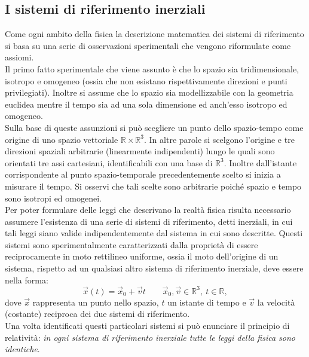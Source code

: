 \subsection{I sistemi di riferimento inerziali}
Come ogni ambito della fisica la descrizione matematica dei sistemi di riferimento si basa su una serie di osservazioni sperimentali che vengono riformulate come assiomi.\\

Il primo fatto sperimentale che viene assunto è che lo spazio sia tridimensionale, isotropo e omogeneo (ossia che non esistano rispettivamente direzioni e punti privilegiati). Inoltre si assume che lo spazio sia modellizzabile con la 
geometria euclidea mentre il tempo sia ad una sola dimensione ed anch'esso isotropo ed omogeneo.\\
Sulla base di queste assunzioni si può scegliere un punto dello spazio-tempo come 
origine di uno spazio vettoriale $\mathbb{R}\times\mathbb{R}^3$. In altre parole si scelgono l'origine e tre direzioni spaziali arbitrarie (linearmente indipendenti) lungo le quali sono orientati tre assi cartesiani, identificabili con una base di $\mathbb{R}^3$.
Inoltre dall'istante corrispondente al punto spazio-temporale precedentemente scelto si inizia a misurare il tempo. Si osservi che tali scelte sono arbitrarie poiché spazio e tempo sono isotropi ed omogenei.\\

Per poter formulare delle leggi che descrivano la realtà fisica risulta necessario assumere l'esistenza di una serie di sistemi di riferimento, detti inerziali, in cui tali leggi siano valide indipendentemente dal sistema in cui sono descritte. Questi sistemi sono sperimentalmente caratterizzati dalla proprietà di essere reciprocamente in moto rettilineo uniforme, ossia il moto dell'origine di un sistema, rispetto ad un qualsiasi altro sistema di riferimento inerziale, deve essere nella forma: 
\begin{equation}
	\vec x(t)=\vec x_0+\vec vt \qquad \vec x_0,\vec v\in \mathbb{R}^3, \ t\in\mathbb{R},
\end{equation}
dove $\vec x$ rappresenta un punto nello spazio, $t$ un istante di tempo e $\vec v$ la velocità (costante) reciproca dei due sistemi di riferimento.\\
Una volta identificati questi particolari sistemi  si può enunciare il principio di relatività: \emph{in ogni sistema di riferimento inerziale tutte le leggi della fisica sono identiche}.\\

